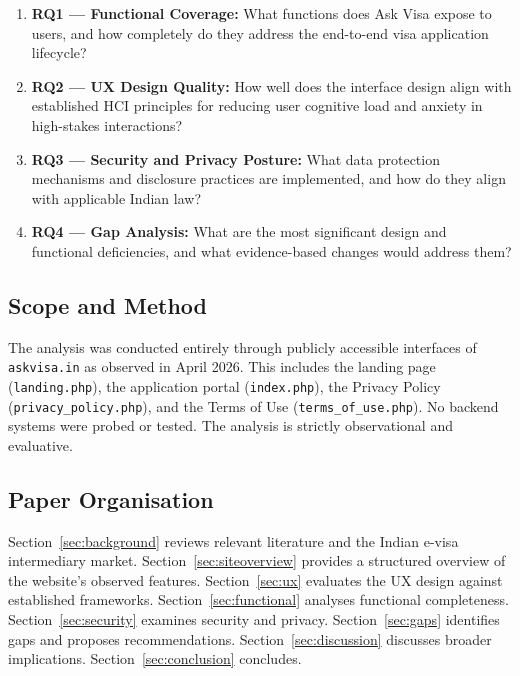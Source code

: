 \documentclass[journal, 10pt, twoside]{IEEEtran}
\begin{document}
\begin{enumerate}
  \item \textbf{RQ1 --- Functional Coverage:} What functions does Ask Visa
  expose to users, and how completely do they address the end-to-end visa
  application lifecycle?
  \item \textbf{RQ2 --- UX Design Quality:} How well does the interface
  design align with established HCI principles for reducing user cognitive
  load and anxiety in high-stakes interactions?
  \item \textbf{RQ3 --- Security and Privacy Posture:} What data protection
  mechanisms and disclosure practices are implemented, and how do they align
  with applicable Indian law?
  \item \textbf{RQ4 --- Gap Analysis:} What are the most significant
  design and functional deficiencies, and what evidence-based changes
  would address them?
\end{enumerate}

\subsection{Scope and Method}
The analysis was conducted entirely through publicly accessible interfaces
of \texttt{askvisa.in} as observed in April 2026. This includes the landing
page (\texttt{landing.php}), the application portal (\texttt{index.php}),
the Privacy Policy (\texttt{privacy\_policy.php}), and the Terms of Use
(\texttt{terms\_of\_use.php}). No backend systems were probed or tested.
The analysis is strictly observational and evaluative.

\subsection{Paper Organisation}
Section~\ref{sec:background} reviews relevant literature and the Indian
e-visa intermediary market. Section~\ref{sec:siteoverview} provides a
structured overview of the website's observed features. Section~\ref{sec:ux}
evaluates the UX design against established frameworks.
Section~\ref{sec:functional} analyses functional completeness.
Section~\ref{sec:security} examines security and privacy.
Section~\ref{sec:gaps} identifies gaps and proposes recommendations.
Section~\ref{sec:discussion} discusses broader implications.
Section~\ref{sec:conclusion} concludes.

\end{document}
